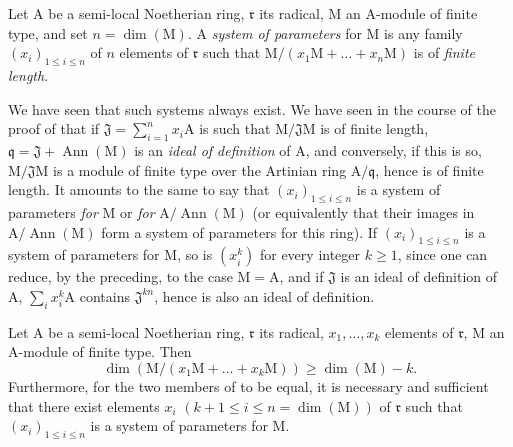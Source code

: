 \begin{definition}[16.3.6]
\label{0.16.3.6}
Let $\mathrm{A}$ be a semi-local Noetherian ring, $\mathfrak{r}$ its radical, $\mathrm{M}$ an $\mathrm{A}$-module of finite type, and set $n=\dim(\mathrm{M})$.
A \emph{system of parameters} for $\mathrm{M}$ is any family $(x_i)_{1\leq i\leq n}$ of $n$ elements of $\mathfrak{r}$ such that $\mathrm{M}/(x_1\mathrm{M}+\ldots+x_n\mathrm{M})$ is of \emph{finite length}.
\end{definition}

We have seen  that such systems always exist.
We have seen in the course of the proof of  that if $\mathfrak{J}=\sum_{i=1}^n x_i\mathrm{A}$ is such that $\mathrm{M}/\mathfrak{J}\mathrm{M}$ is of finite length, $\mathfrak{q}=\mathfrak{J}+\operatorname{Ann}(\mathrm{M})$ is an \emph{ideal of definition} of $\mathrm{A}$, and conversely, if this is so, $\mathrm{M}/\mathfrak{J}\mathrm{M}$ is a module of finite type over the Artinian ring $\mathrm{A}/\mathfrak{q}$, hence is of finite length.
It amounts to the same to say that $(x_i)_{1\leq i\leq n}$ is a system of parameters \emph{for} $\mathrm{M}$ or \emph{for} $\mathrm{A}/\operatorname{Ann}(\mathrm{M})$ (or equivalently that their images in $\mathrm{A}/\operatorname{Ann}(\mathrm{M})$ form a system of parameters for this ring).
If $(x_i)_{1\leq i\leq n}$ is a system of parameters for $\mathrm{M}$, so is $(x_i^k)$ for every integer $k\geq 1$, since one can reduce, by the preceding, to the case $\mathrm{M}=\mathrm{A}$, and if $\mathfrak{J}$ is an ideal of definition of $\mathrm{A}$, $\sum_i x_i^k\mathrm{A}$ contains $\mathfrak{J}^{kn}$, hence is also an ideal of definition.

\begin{proposition}[16.3.7]
\label{0.16.3.7}
Let $\mathrm{A}$ be a semi-local Noetherian ring, $\mathfrak{r}$ its radical, $x_1,\ldots,x_k$ elements of $\mathfrak{r}$, $\mathrm{M}$ an $\mathrm{A}$-module of finite type.
Then
\begin{equation}
\label{0.16.3.7.1}
\tag{16.3.7.1}
  \dim(\mathrm{M}/(x_1\mathrm{M}+\ldots+x_k\mathrm{M}))\geq\dim(\mathrm{M})-k.
\end{equation}
Furthermore, for the two members of  to be equal, it is necessary and sufficient that there exist elements $x_i$ $(k+1\leq i\leq n=\dim(\mathrm{M}))$ of $\mathfrak{r}$ such that $(x_i)_{1\leq i\leq n}$ is a system of parameters for $\mathrm{M}$.
\end{proposition}

